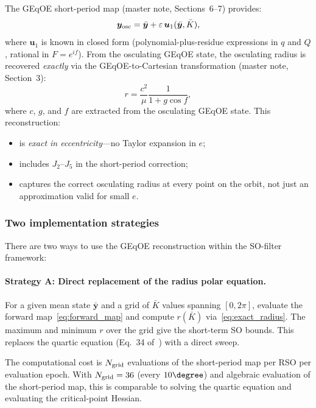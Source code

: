 \documentclass[11pt]{article}
\newcommand{\eps}{\varepsilon}
\begin{document}
The GEqOE short-period map (master note, Sections~6--7) provides:
\begin{equation}
\bm y_{\rm osc} = \bar{\bm y} + \eps\,\bm u_1(\bar{\bm y}, \bar K),
\label{eq:forward_map}
\end{equation}
where $\bm u_1$ is known in closed form (polynomial-plus-residue expressions
in $q$ and $Q$, rational in $F = e^{if}$). From the osculating GEqOE state,
the osculating radius is recovered \emph{exactly} via the GEqOE-to-Cartesian
transformation (master note, Section~3):
\begin{equation}
r = \frac{c^2}{\mu}\frac{1}{1 + g\cos f},
\label{eq:exact_radius}
\end{equation}
where $c$, $g$, and $f$ are extracted from the osculating GEqOE state.
This reconstruction:
\begin{itemize}
\item is \emph{exact in eccentricity}---no Taylor expansion in $e$;
\item includes $J_2$--$J_5$ in the short-period correction;
\item captures the correct osculating radius at every point on the orbit, not
just an approximation valid for small $e$.
\end{itemize}

\subsubsection{Two implementation strategies}

There are two ways to use the GEqOE reconstruction within the SO-filter
framework:

\paragraph{Strategy A: Direct replacement of the radius polar equation.}
For a given mean state $\bar{\bm y}$ and a grid of $\bar K$ values spanning
$[0, 2\pi]$, evaluate the forward map~\eqref{eq:forward_map} and compute
$r(\bar K)$ via~\eqref{eq:exact_radius}. The maximum and minimum $r$ over
the grid give the short-term SO bounds. This replaces the quartic equation
(Eq.~34 of~\cite{rivero2025}) with a direct sweep.

The computational cost is $N_{\rm grid}$ evaluations of the short-period map
per RSO per evaluation epoch. With $N_{\rm grid} = 36$ (every $10\degree$) and
algebraic evaluation of the short-period map, this is comparable to solving
the quartic equation and evaluating the critical-point Hessian.
\end{document}
